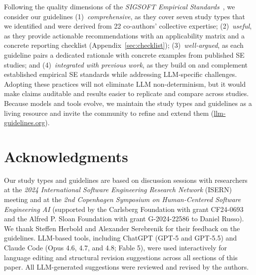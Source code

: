 \documentclass[smallextended]{svjour3}
\begin{document}
Following the quality dimensions of the \emph{SIGSOFT Empirical
Standards}~\cite{ralph2021empiricalstandardssoftwareengineering}, we
consider our guidelines
(1)~\emph{comprehensive}, as they cover seven study types that we
identified and were derived from 22 co-authors' collective expertise;
(2)~\emph{useful}, as they provide actionable recommendations with an
applicability matrix and a concrete reporting checklist
(Appendix~\ref{sec:checklist});
(3)~\emph{well-argued}, as each guideline pairs a dedicated
rationale with concrete examples from published SE studies; and
(4)~\emph{integrated with previous work}, as they build on and
complement established empirical SE standards while addressing
LLM-specific challenges.
Adopting these practices will not eliminate LLM non-determinism, but it
would make claims auditable and results easier to replicate and compare
across studies.
Because models and tools evolve, we maintain the study types and
guidelines as a living resource and invite the community to refine and
extend them (\href{https://llm-guidelines.org/}{llm-guidelines.org}).

\section*{Acknowledgments}

Our study types and guidelines are based on discussion sessions with researchers at the \emph{2024 International Software Engineering Research Network} (ISERN) meeting and at the \emph{2nd Copenhagen Symposium on Human-Centered Software Engineering AI} (supported by the Carlsberg Foundation with grant CF24-0693 and the Alfred P. Sloan Foundation with grant G-2024-22586 to Daniel Russo).
We thank Steffen Herbold and Alexander Serebrenik for their feedback on the guidelines.
LLM-based tools, including ChatGPT (GPT-5 and GPT-5.5) and Claude Code (Opus 4.6, 4.7, and 4.8; Fable 5), were used interactively for language editing and structural revision suggestions across all sections of this paper. All LLM-generated suggestions were reviewed and revised by the authors.
\end{document}
